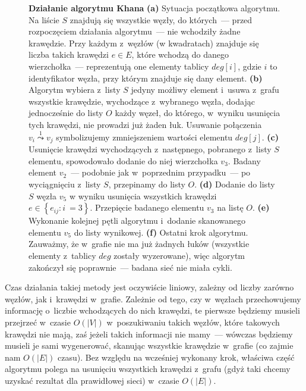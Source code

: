 \begin{figure}[!htbp]
\begin{subfigure}[b]{0.25\textwidth}
		\caption{}
	\end{subfigure}
	\caption{\textbf{Działanie algorytmu Khana} \textbf{(a)} Sytuacja początkowa algorytmu. Na liście $S$ znajdują się wszystkie węzły, do których~--- przed rozpoczęciem działania algorytmu~--- nie wchodziły żadne krawędzie. Przy każdym z~węzłów (w kwadratach) znajduje się liczba takich krawędzi $e \in E$, które wchodzą do danego wierzchołka~--- reprezentują one elementy tablicy $deg \left[ i \right]$, gdzie $i$ to identyfikator węzła, przy którym znajduje się dany element. \textbf{(b)} Algorytm wybiera z~listy $S$ jedyny możliwy element i~usuwa z~grafu wszystkie krawędzie, wychodzące z~wybranego węzła, dodając jednocześnie do listy $O$ każdy węzeł, do którego, w~wyniku usunięcia tych krawędzi, nie prowadzi już żaden łuk. Usuwanie połączenia $v_{i} \overset{1} \leadsto v_{j}$ symbolizujemy zmniejszeniem wartości elementu $deg \left[ j \right]$. \textbf{(c)} Usunięcie krawędzi wychodzących z~następnego, pobranego z~listy $S$ elementu, spowodowało dodanie do niej wierzchołka $v_{3}$. Badany element $v_{2}$~--- podobnie jak w~poprzednim przypadku~--- po wyciągnięciu z~listy $S$, przepinamy do listy $O$. \textbf{(d)} Dodanie do listy $S$ węzła $v_{5}$ w wyniku usunięcia wszystkich krawędzi $e \in \left\{ e_{ij} : i~= 3 \right\}$. Przepięcie badanego elementu $v_{3}$ na listę $O$. \textbf{(e)} Wykonanie kolejnej pętli algorytmu i~dodanie skanowanego elementu $v_{5}$ do listy wynikowej.  \textbf{(f)} Ostatni krok algorytmu. Zauważmy, że w~grafie nie ma już żadnych łuków (wszystkie elementy z~tablicy $deg$ zostały wyzerowane), więc algorytm zakończył się poprawnie~--- badana sieć nie miała cykli.} \label{fig:exampleKhan}
\end{figure}

Czas działania takiej metody jest oczywiście liniowy, zależny od liczby zarówno węzłów, jak i~krawędzi w~grafie. Zależnie od tego, czy w~węzłach przechowujemy informację o~liczbie wchodzących do nich krawędzi, te pierwsze będziemy musieli przejrzeć w~czasie $O \left( \left| V \right| \right)$ w~poszukiwaniu takich węzłów, które takowych krawędzi nie mają, zaś jeżeli takich informacji nie mamy~--- wówczas będziemy musieli je sami wygenerować, skanując wszystkie krawędzie w~grafie (co zajmie nam $O \left( \left| E \right| \right)$ czasu). Bez względu na wcześniej wykonany krok, właściwa część algorytmu polega na usunięciu wszystkich krawędzi z~grafu (gdyż taki chcemy uzyskać rezultat dla prawidłowej sieci) w~czasie $O \left( \left| E \right| \right)$.

